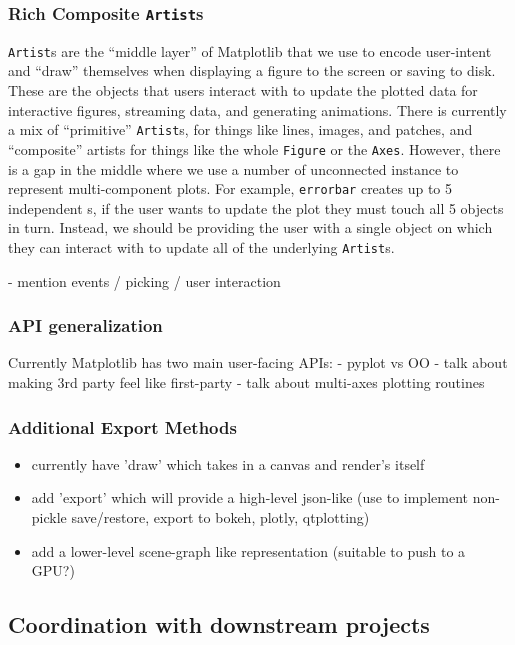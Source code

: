 \documentclass[11pt]{article}  %
\begin{document}
\subsubsection{Rich Composite \texttt{Artist}s}
\texttt{Artist}s are the ``middle layer'' of Matplotlib that we use to
encode user-intent and ``draw'' themselves when displaying a figure to
the screen or saving to disk.  These are the objects that users
interact with to update the plotted data for interactive figures,
streaming data, and generating animations.  There is currently a mix
of ``primitive'' \texttt{Artist}s, for things like lines, images, and
patches, and ``composite'' artists for things like the whole
\texttt{Figure} or the \texttt{Axes}.  However, there is a gap in the
middle where we use a number of unconnected  instance
to represent multi-component plots.  For example, \texttt{errorbar}
creates up to 5 independent s, if the user wants to
update the plot they must touch all 5 objects in turn.  Instead, we
should be providing the user with a single object on which they can
interact with to update all of the underlying \texttt{Artist}s.

- mention events / picking / user interaction

\subsubsection{API generalization}
Currently Matplotlib has two main user-facing APIs:
- pyplot vs OO
- talk about making 3rd party feel like first-party
- talk about multi-axes plotting routines




\subsubsection{Additional Export Methods}

\begin{itemize}
\item currently have 'draw' which takes in a canvas and render's itself
\item add 'export' which will provide a high-level json-like (use to
  implement non-pickle save/restore, export to {bokeh, plotly,
    qtplotting})
\item add a lower-level scene-graph like representation (suitable to push to a GPU?)
\end{itemize}


\subsection{Coordination with downstream projects}
\end{document}
